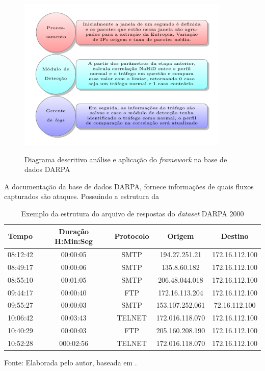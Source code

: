 \begin{figure}[!ht]
 	\centering
 	\caption{Diagrama descritivo análise e aplicação do \textit{framework} na base de dados DARPA  }
 	\includegraphics[width=0.9\textwidth]{figs/analiseDarpa.pdf}\\
 	\label{fig:analiseDarpa}
\end{figure}

A documentação da base de dados DARPA, fornece informações de quais fluxos capturados são ataques. Possuindo a estrutura da  
 \begin{table}[!htb]
 	\centering
 	\begin{threeparttable}
 		\caption{Exemplo da estrutura do  arquivo de respostas do \textit{dataset} DARPA 2000}
 		\label{Tab:RespostasDarpa}
 		\begin{tabular}{c c c c c }
 			\toprule
 			 \textbf{Tempo} &  \textbf{Duração H:Min:Seg} & \textbf{Protocolo} & \textbf{Origem} & \textbf{Destino}
 			\\ \midrule
 			  08:12:42 & 00:00:05 & SMTP& 194.27.251.21 & 172.16.112.100    \\ \midrule
			 08:49:17 & 00:00:06 & SMTP&  135.8.60.182 & 172.16.112.100    \\ \midrule
			 08:55:10 & 00:01:05 & SMTP&  206.48.044.018 & 172.16.112.100    \\ \midrule
			 09:44:17 & 00:00:40 & FTP&  172.16.113.204 & 172.16.112.100    \\ \midrule
			 09:55:27 & 00:00:03 & SMTP&  153.107.252.061 & 72.16.112.100    \\ \midrule
			 10:06:42 & 00:03:43 & TELNET&  172.016.118.070 & 172.16.112.100    \\ \midrule
			 10:40:29 & 00:00:03 & FTP&  205.160.208.190 & 172.16.112.100    \\ \midrule
 			 10:52:28 & 000:02:56 & TELNET& 172.016.118.070 & 172.16.112.100  \\ \bottomrule
 		\end{tabular}
 		{Fonte: Elaborada pelo autor, baseada em \cite{DARPA}.}
 	\end{threeparttable}
 \end{table}
 
